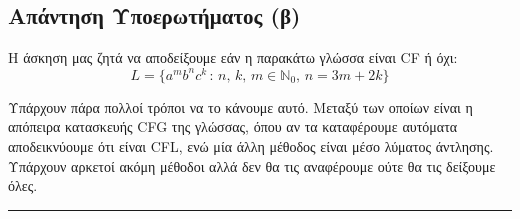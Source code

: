 \subsection{Απάντηση Υποερωτήματος (β)}
\label{ssec:Solution_3.2}
\doublespacing

Η άσκηση μας ζητά να αποδείξουμε εάν η παρακάτω γλώσσα είναι CF ή όχι:
\[L = \{a^mb^nc^k\,:\,n,\,k,\,m\in\mathbb{N}_0,\, n=3m+2k\}\]

\par
Υπάρχουν πάρα πολλοί τρόποι να το κάνουμε αυτό. Μεταξύ των οποίων είναι η απόπειρα κατασκευής CFG της γλώσσας, όπου
αν τα καταφέρουμε αυτόματα αποδεικνύουμε ότι είναι CFL, ενώ μία άλλη μέθοδος είναι μέσο λύματος άντλησης. Υπάρχουν
αρκετοί ακόμη μέθοδοι αλλά δεν θα τις αναφέρουμε ούτε θα τις δείξουμε όλες.


\begin{center}
	\noindent\rule{\linewidth}{0.5pt}
\end{center}
\clearpage
